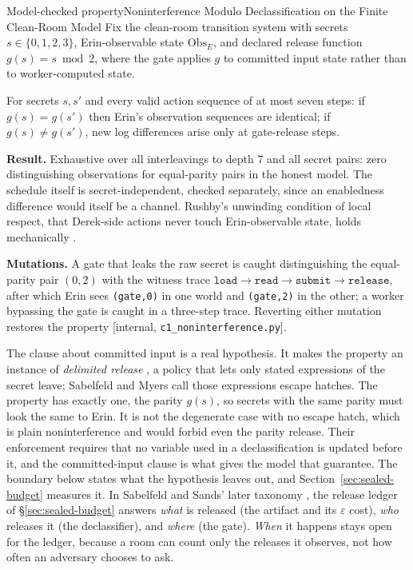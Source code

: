 \documentclass[11pt,a4paper]{article}
\theoremstyle{definition}
\begin{document}
\begin{pdclaim}{Model-checked property}{Noninterference Modulo Declassification on the Finite Clean-Room Model}
\setlength{\parskip}{4pt plus 1pt}
\label{thm:sealed-noninterference}
\relax
Fix the clean-room transition system with secrets $s\in\{0,1,2,3\}$,
Erin-observable state $\mathrm{Obs}_E$, and declared release function
$g(s)=s\bmod 2$, where the gate applies $g$ to committed input state rather
than to worker-computed state.

For secrets $s,s'$ and every valid action
sequence of at most seven steps: if $g(s)=g(s')$ then Erin's observation
\mbox{sequences} are identical; if $g(s)\neq g(s')$, new log differences arise
only at gate-release steps.

\par\noindent\textbf{Result.} Exhaustive over all interleavings to depth 7 and all secret
pairs: zero distinguishing observations for equal-parity pairs in the honest model. The schedule
itself is secret-independent, checked separately, since an enabledness
difference would itself be a channel. Rushby's unwinding condition of local
respect, that Derek-side actions never touch Erin-observable state, holds
mechanically .

\textbf{Mutations.} A gate that leaks the raw
secret is caught distinguishing the equal-parity pair $(0,2)$ with the witness
trace $\mathtt{load}\to\mathtt{read}\to\mathtt{submit}\to\mathtt{release}$,
after which Erin sees \texttt{(gate,0)} in one world and \texttt{(gate,2)} in
the other; a worker bypassing the gate is caught in a three-step trace.
Reverting either mutation restores the property [internal,
\texttt{c1\_noninterference.py}].
\end{pdclaim}

The clause about committed input is a real hypothesis. It makes the property
an instance of \emph{delimited release} , a policy that lets
only stated expressions of the secret leave; Sabelfeld and Myers call those
expressions escape hatches. The property has exactly one, the parity $g(s)$,
so secrets with the same parity must look the same to Erin. It is not the
degenerate case with no escape hatch, which is plain noninterference and
would forbid even the parity release. Their enforcement requires that no
variable used in a declassification is updated before it, and the
committed-input clause is what gives the model that guarantee. The boundary
below states what the hypothesis leaves out, and
Section~\ref{sec:sealed-budget} measures it. In Sabelfeld and Sands' later
taxonomy , the release ledger of \S\ref{sec:sealed-budget}
answers \emph{what} is released (the artifact and its $\varepsilon$ cost),
\emph{who} releases it (the declassifier), and \emph{where} (the gate).
\emph{When} it happens stays open for the ledger, because a room can count
only the releases it observes, not how often an adversary chooses to ask.
\end{document}

